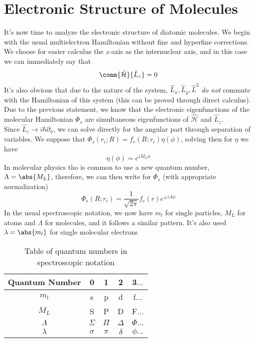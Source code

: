 \documentclass[a4paper, 11pt]{book}
\newcommand{\1}{\opr{\mathds{1}}}
\newcommand{\ham}{\mathcal{H}}
\newcommand{\opr}[1]{\hat{#1}}
\theoremstyle{plain}
\begin{document}
	\chapter{Electronic Structure of Molecules}
	It's now time to analyze the electronic structure of diatomic molecules. We begin with the usual multielectron Hamiltonian without fine and hyperfine corrections. We choose for easier calculus the $z$-axis as the internuclear axis, and in this case we can immediately say that
	\begin{equation*}
		\comm{\opr{\ham}}{\opr{L}_z}=0
	\end{equation*}
	It's also obvious that due to the nature of the system, $\opr{L}_x,\opr{L}_y,\opr{L}^2$ \emph{do not} commute with the Hamiltonian of this system (this can be proved through direct calculus). Due to the previous statement, we know that the electronic eigenfunctions of the molecular Hamiltonian $\Phi_s$ are simultaneous eigenfunctions of $\opr{\ham}$ and $\opr{L}_z$.\\
	Since $\opr{L}_z\to i\hbar\partial_{\phi}$, we can solve directly for the angular part through separation of variables. We suppose that $\Phi_s(r_i;R)=f_r(R;r_i)\eta(\phi)$, solving then for $\eta$ we have \begin{equation}
		\eta(\phi)=e^{iM_L\phi}
		\label{eq:angularpart}
	\end{equation}
	In molecular physics tho is common to use a new quantum number, $\Lambda=\abs{M_L}$, therefore, we can then write for $\Phi_s$ (with appropriate normalization)
	\begin{equation}
		\Phi_s(R;r_i)=\frac{1}{\sqrt{2\pi}}f_s(r)e^{\pm i\Lambda\phi}
		\label{eq:electronicwavefunction}
	\end{equation}
	In the usual spectroscopic notation, we now have $m_l$ for single particles, $M_L$ for atoms and $\Lambda$ for molecules, and it follows a similar pattern. It's also used $\lambda=\abs{m_l}$ for single molecular electrons
	\begin{table}[H]
		\centering
		\begin{tabular}{|c|c|c|c|c}
			\hline
			Quantum Number&0&1&2&3$\ldots$\\
			\hline
			$m_l$&s&p&d&f$\ldots$\\
			\hline
			$M_L$&S&P&D&F$\ldots$\\
			\hline
			$\Lambda$&$\Sigma$&$\Pi$&$\Delta$&$\Phi\ldots$\\
			\hline
			$\lambda$&$\sigma$&$\pi$&$\delta$&$\phi\ldots$\\
			\hline
		\end{tabular}
		\caption{Table of quantum numbers in spectroscopic notation}
		\label{tab:quantumnumbers}
	\end{table}
\end{document}
